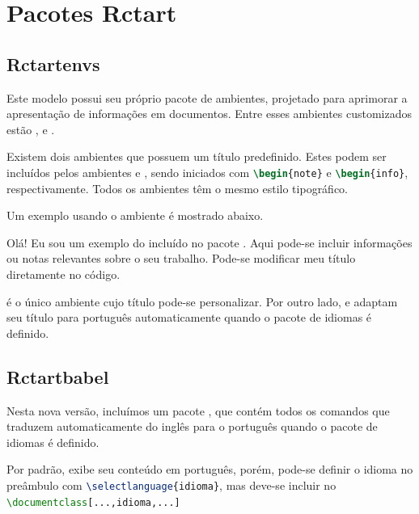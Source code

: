 \documentclass[12pt,a4paper,oneside,linenumbers=off,latinmodern=off,timesnews=off,spanish,english,portuges]{rctart-class/rctart}
\begin{document}
        
        

    \section{Pacotes Rctart}

    \subsection{Rctartenvs}
    
        Este modelo possui seu próprio pacote  de ambientes, projetado para aprimorar a apresentação de informações em documentos. Entre esses ambientes customizados estão ,  e .
    
        Existem dois ambientes que possuem um título predefinido. Estes podem ser incluídos pelos ambientes  e , sendo iniciados com \lstinline[language=TeX]|\begin{note}| e \lstinline[language=TeX]|\begin{info}|, respectivamente. Todos os ambientes têm o mesmo estilo tipográfico.
    	
    	Um exemplo usando o ambiente  é mostrado abaixo.
    
        \begin{rctartenv}[frametitle=Ambiente com título personalizado]
            Olá! Eu sou um exemplo do  incluído no pacote . Aqui  pode-se incluir informações ou notas relevantes sobre o seu trabalho. Pode-se modificar meu título diretamente no código.
        \end{rctartenv}
    
         é o único ambiente cujo título pode-se personalizar. Por outro lado,  e  adaptam seu título para português automaticamente quando o pacote de idiomas  é definido.

    \subsection{Rctartbabel}

        Nesta nova versão, incluímos um pacote  , que contém todos os comandos que traduzem automaticamente do inglês para o português quando o pacote de idiomas é definido.
\begin{note}
         Por padrão,  exibe seu conteúdo em português, porém, pode-se definir o idioma no preâmbulo com \lstinline[language=TeX]|\selectlanguage{idioma}|, mas deve-se incluir  no \lstinline[language=TeX]|\documentclass[...,idioma,...]|
\end{note}
\end{document}
